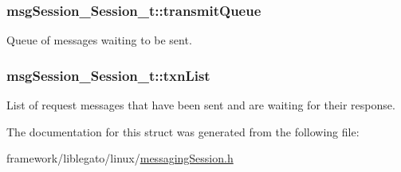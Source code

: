 \subsubsection[{\texorpdfstring{transmit\+Queue}{transmitQueue}}]{ msg\+Session\+\_\+\+Session\+\_\+t\+::transmit\+Queue}\hypertarget{structmsg_session___session__t_ae8c1c342359819b5a42be4f397d1dfb1}{}\label{structmsg_session___session__t_ae8c1c342359819b5a42be4f397d1dfb1}


Queue of messages waiting to be sent. 

\subsubsection[{\texorpdfstring{txn\+List}{txnList}}]{ msg\+Session\+\_\+\+Session\+\_\+t\+::txn\+List}\hypertarget{structmsg_session___session__t_a5b9073fec8c9a4121a5e7cd07e31f1a2}{}\label{structmsg_session___session__t_a5b9073fec8c9a4121a5e7cd07e31f1a2}
List of request messages that have been sent and are waiting for their response. 

The documentation for this struct was generated from the following file\+:\begin{DoxyCompactItemize}
\item 
framework/liblegato/linux/\hyperlink{messaging_session_8h}{messaging\+Session.\+h}\end{DoxyCompactItemize}
